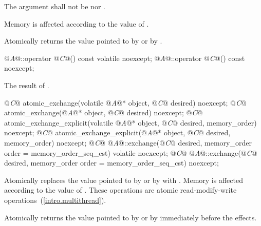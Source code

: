 \begin{itemdescr}
\pnum
\requires The  argument shall not be  nor .

\pnum
\effects Memory is affected according to the value of .

\pnum
\returns Atomically returns the value pointed to by  or by .
\end{itemdescr}

%
%
\begin{itemdecl}
@\textit{A}@::operator @\textit{C}@() const volatile noexcept;
@\textit{A}@::operator @\textit{C}@() const noexcept;
\end{itemdecl}

\begin{itemdescr}
\pnum
\effects {}

\pnum
\returns The result of .
\end{itemdescr}


%
%
%
%
%
%
\begin{itemdecl}
@\textit{C}@ atomic_exchange(volatile @\textit{A}@* object, @\textit{C}@ desired) noexcept;
@\textit{C}@ atomic_exchange(@\textit{A}@* object, @\textit{C}@ desired) noexcept;
@\textit{C}@ atomic_exchange_explicit(volatile @\textit{A}@* object, @\textit{C}@ desired, memory_order) noexcept;
@\textit{C}@ atomic_exchange_explicit(@\textit{A}@* object, @\textit{C}@ desired, memory_order) noexcept;
@\textit{C}@ @\textit{A}@::exchange(@\textit{C}@ desired, memory_order order = memory_order_seq_cst) volatile noexcept;
@\textit{C}@ @\textit{A}@::exchange(@\textit{C}@ desired, memory_order order = memory_order_seq_cst) noexcept;
\end{itemdecl}

\begin{itemdescr}
\pnum
\effects Atomically replaces the value pointed to by  or by 
with .
Memory is affected according to the value of .
These operations are atomic read-modify-write operations~(\ref{intro.multithread}).

\pnum
\returns Atomically returns the value pointed to by  or by  immediately before the effects.
\end{itemdescr}

